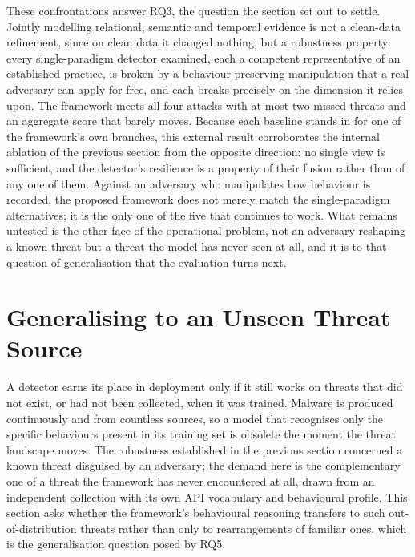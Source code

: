 \documentclass[%
    BCOR=10mm,
    DIV=13,
    toc=bibliography,
    toc=listof,
    oneside,
    12pt,
]{scrbook}
\begin{document}
These confrontations answer RQ3, the question the section set out to settle. Jointly
modelling relational, semantic and temporal evidence is not a clean-data
refinement, since on clean data it changed nothing, but a robustness property:
every single-paradigm detector examined, each a competent representative of an
established practice, is broken by a behaviour-preserving manipulation that a real
adversary can apply for free, and each breaks precisely on the dimension it relies
upon. The framework meets all four attacks with at most two missed threats and an
aggregate score that barely moves. Because each baseline stands in for one of the
framework's own branches, this external result corroborates the internal ablation
of the previous section from the opposite direction: no single view is sufficient,
and the detector's resilience is a property of their fusion rather than of any one
of them. Against an adversary who manipulates how behaviour is recorded, the
proposed framework does not merely match the single-paradigm alternatives; it is
the only one of the five that continues to work. What remains untested is the other
face of the operational problem, not an adversary reshaping a known threat but a
threat the model has never seen at all, and it is to that question of
generalisation that the evaluation turns next.


\section{Generalising to an Unseen Threat Source}
\label{sec:generalisation_results}

A detector earns its place in deployment only if it still works on threats that
did not exist, or had not been collected, when it was trained. Malware is produced
continuously and from countless sources, so a model that recognises only the
specific behaviours present in its training set is obsolete the moment the threat
landscape moves. The robustness established in the previous section concerned a
known threat disguised by an adversary; the demand here is the complementary one of
a threat the framework has never encountered at all, drawn from an independent
collection with its own API vocabulary and behavioural profile. This section asks
whether the framework's behavioural reasoning transfers to such out-of-distribution
threats rather than only to rearrangements of familiar ones, which is the
generalisation question posed by RQ5.
\end{document}
